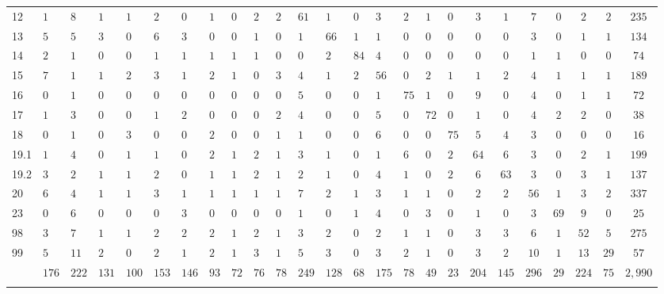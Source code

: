 \begin{table}[!htbp]
\begin{tabularx}{\textwidth}{XXXXXXXXXXXXXXXXXXccccccc}
12 & $1$ & $8$ & $1$ & $1$ & $2$ & $0$ & $1$ & $0$ & $2$ & $2$ & $61$ & $1$ & $0$ & $3$ & $2$ & $1$ & $0$ & $3$ & $1$ & $7$ & $0$ & $2$ & $2$ & $235$ \\ 
13 & $5$ & $5$ & $3$ & $0$ & $6$ & $3$ & $0$ & $0$ & $1$ & $0$ & $1$ & $66$ & $1$ & $1$ & $0$ & $0$ & $0$ & $0$ & $0$ & $3$ & $0$ & $1$ & $1$ & $134$ \\ 
14 & $2$ & $1$ & $0$ & $0$ & $1$ & $1$ & $1$ & $1$ & $1$ & $0$ & $0$ & $2$ & $84$ & $4$ & $0$ & $0$ & $0$ & $0$ & $0$ & $1$ & $1$ & $0$ & $0$ & $74$ \\ 
15 & $7$ & $1$ & $1$ & $2$ & $3$ & $1$ & $2$ & $1$ & $0$ & $3$ & $4$ & $1$ & $2$ & $56$ & $0$ & $2$ & $1$ & $1$ & $2$ & $4$ & $1$ & $1$ & $1$ & $189$ \\ 
16 & $0$ & $1$ & $0$ & $0$ & $0$ & $0$ & $0$ & $0$ & $0$ & $0$ & $5$ & $0$ & $0$ & $1$ & $75$ & $1$ & $0$ & $9$ & $0$ & $4$ & $0$ & $1$ & $1$ & $72$ \\ 
17 & $1$ & $3$ & $0$ & $0$ & $1$ & $2$ & $0$ & $0$ & $0$ & $2$ & $4$ & $0$ & $0$ & $5$ & $0$ & $72$ & $0$ & $1$ & $0$ & $4$ & $2$ & $2$ & $0$ & $38$ \\ 
18 & $0$ & $1$ & $0$ & $3$ & $0$ & $0$ & $2$ & $0$ & $0$ & $1$ & $1$ & $0$ & $0$ & $6$ & $0$ & $0$ & $75$ & $5$ & $4$ & $3$ & $0$ & $0$ & $0$ & $16$ \\ 
19.1 & $1$ & $4$ & $0$ & $1$ & $1$ & $0$ & $2$ & $1$ & $2$ & $1$ & $3$ & $1$ & $0$ & $1$ & $6$ & $0$ & $2$ & $64$ & $6$ & $3$ & $0$ & $2$ & $1$ & $199$ \\ 
19.2 & $3$ & $2$ & $1$ & $1$ & $2$ & $0$ & $1$ & $1$ & $2$ & $1$ & $2$ & $1$ & $0$ & $4$ & $1$ & $0$ & $2$ & $6$ & $63$ & $3$ & $0$ & $3$ & $1$ & $137$ \\ 
20 & $6$ & $4$ & $1$ & $1$ & $3$ & $1$ & $1$ & $1$ & $1$ & $1$ & $7$ & $2$ & $1$ & $3$ & $1$ & $1$ & $0$ & $2$ & $2$ & $56$ & $1$ & $3$ & $2$ & $337$ \\ 
23 & $0$ & $6$ & $0$ & $0$ & $0$ & $3$ & $0$ & $0$ & $0$ & $0$ & $1$ & $0$ & $1$ & $4$ & $0$ & $3$ & $0$ & $1$ & $0$ & $3$ & $69$ & $9$ & $0$ & $25$ \\ 
98 & $3$ & $7$ & $1$ & $1$ & $2$ & $2$ & $2$ & $1$ & $2$ & $1$ & $3$ & $2$ & $0$ & $2$ & $1$ & $1$ & $0$ & $3$ & $3$ & $6$ & $1$ & $52$ & $5$ & $275$ \\ 
99 & $5$ & $11$ & $2$ & $0$ & $2$ & $1$ & $2$ & $1$ & $3$ & $1$ & $5$ & $3$ & $0$ & $3$ & $2$ & $1$ & $0$ & $3$ & $2$ & $10$ & $1$ & $13$ & $29$ & $57$ \\ 
 & $176$ & $222$ & $131$ & $100$ & $153$ & $146$ & $93$ & $72$ & $76$ & $78$ & $249$ & $128$ & $68$ & $175$ & $78$ & $49$ & $23$ & $204$ & $145$ & $296$ & $29$ & $224$ & $75$ & $2,990$ \\ 
\hline \\[-1.8ex] 
\end{tabularx} 
\end{table} 
